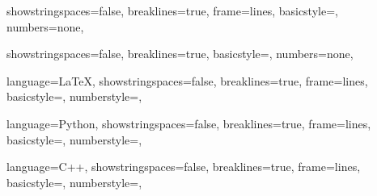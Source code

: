\newlength{\numwidth}
\makeatletter
\newcommand{\setlinenum}[1]
{
	\setlength{\numwidth}{\widthof{\footnotesize{\lst@numberstyle{#1}}}}
	\def\lst@PlaceNumber{%
		\makebox[\numwidth+1em][l]{%
			\makebox[\numwidth][r]{\footnotesize\lst@numberstyle{\thelstnumber}}
		}
	}
}
\makeatother
\setlinenum{9} %

{
	showstringspaces=false,
	breaklines=true,
	frame=lines,
	basicstyle=\footnotesize\ttfamily,
	numbers=none,
}

{
	showstringspaces=false,
	breaklines=true,
	basicstyle=\footnotesize\ttfamily,
	numbers=none,
}

{
	language=LaTeX,
	showstringspaces=false,
	breaklines=true,
	frame=lines,
	basicstyle=\footnotesize\ttfamily,
	numberstyle=\footnotesize\ttfamily,
}

{
	language=Python,
	showstringspaces=false,
	breaklines=true,
	frame=lines,
	basicstyle=\footnotesize\ttfamily,
	numberstyle=\footnotesize\ttfamily,
}

{
	language=C++,
	showstringspaces=false,
	breaklines=true,
	frame=lines,
	basicstyle=\footnotesize\ttfamily,
	numberstyle=\footnotesize\ttfamily,
}
